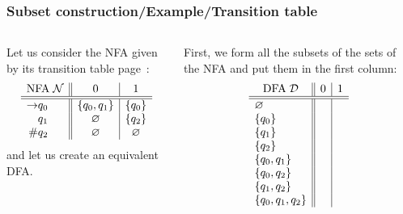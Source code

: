 % 
\begin{frame}
\frametitle{Subset construction/Example/Transition table}

\begin{columns}

   Let us consider the NFA given by its
  transition table page~\pageref{nfa_01_suffix_table}:
  \[
  \begin{array}{r@{}l||c|c}
    \multicolumn{2}{c||}{\text{NFA} \; {\cal N}} & 0 & 1\\
    \hline\hline
    \rightarrow & q_0 & \{q_0, q_1\} & \{q_0\}\\
                & q_1 & \varnothing  & \{q_2\}\\
    \#          & q_2 & \varnothing  & \varnothing
  \end{array}
  \]
  and let us create an equivalent DFA. 
 
   First, we form all the subsets of the sets of
  the NFA and put them in the first column:
  \[
  \begin{array}{r@{}l||c|c}
    \multicolumn{2}{c||}{\text{DFA} \; {\cal D}} & 0 & 1\\
    \hline\hline
    & \varnothing       & &\\
    & \{q_0\}           & &\\
    & \{q_1\}           & &\\
    & \{q_2\}           & &\\
    & \{q_0, q_1\}      & &\\
    & \{q_0, q_2\}      & &\\
    & \{q_1, q_2\}      & &\\
    & \{q_0, q_1, q_2\} & &
  \end{array}
  \]
\end{columns}

\end{frame}

